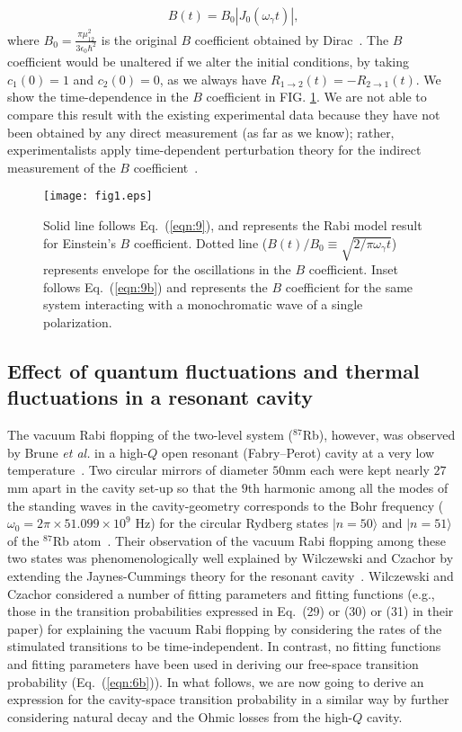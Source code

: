 \documentclass[aps,pra,twocolumn,showpacs,preprintnumbers,amsmath,amssymb,footinbib]{revtex4}
\begin{document}
\begin{eqnarray}\label{eqn:9}
B(t)=B_0|J_0(\omega_\gamma t)|,
\end{eqnarray}
where $B_0=\frac{\pi\mu_{12}^2}{3\epsilon_0\hbar^2}$ is the original $B$ coefficient obtained by Dirac~\cite{Dirac,Griffiths}. The $B$ coefficient would be unaltered if we alter the initial conditions, by taking $c_1(0)=1$ and $c_2(0)=0$, as we always have $R_{1\rightarrow2}(t)=-R_{2\rightarrow1}(t)$. We show the time-dependence in the $B$ coefficient in FIG. \ref{fig1}. We are not able to compare this result with the existing experimental data because they have not been obtained by any direct measurement (as far as we know); rather, experimentalists apply time-dependent perturbation theory for the indirect measurement of the $B$ coefficient~\cite{Lawrence}.  

\begin{figure}
\texttt{[image: fig1.eps]}
\caption{Solid line follows Eq.~(\ref{eqn:9}), and represents the Rabi model result for Einstein's $B$ coefficient. Dotted line ($B(t)/B_0\equiv\sqrt{2/\pi\omega_\gamma t}$) represents envelope for the oscillations in the $B$ coefficient. Inset follows Eq.~(\ref{eqn:9b}) and represents the $B$ coefficient for the same system interacting with a monochromatic wave of a single polarization. 
\label{fig1}}
\end{figure}

\subsection{Effect of quantum fluctuations and thermal fluctuations  in a resonant cavity}
The vacuum Rabi flopping of the two-level system ($^{87}$Rb), however, was observed by Brune \textit{et al.} in a high-$Q$ open resonant (Fabry--Perot) cavity at a very low temperature~\cite{Brune}. Two circular mirrors of diameter $50$mm each were kept nearly $27$mm apart in the cavity set-up so that the $9$th harmonic among all the modes of the standing waves in the cavity-geometry corresponds to the Bohr frequency ($\omega_0=2\pi\times51.099\times10^9$ Hz) for the circular Rydberg states $|n=50\rangle$ and $|n=51\rangle$ of the $^{87}$Rb atom~\cite{Brune}. Their observation of the vacuum Rabi flopping among these two states was phenomenologically well explained by Wilczewski and Czachor by extending the Jaynes-Cummings theory for the resonant cavity~\cite{Wilczewski}. Wilczewski and Czachor considered a number of fitting parameters and fitting functions (e.g., those in the transition probabilities expressed in Eq.~(29) or (30) or (31) in their paper) for explaining the vacuum Rabi flopping by considering the rates of the stimulated transitions to be time-independent. In contrast, no fitting functions and fitting parameters have been used in deriving our free-space transition probability (Eq.~(\ref{eqn:6b})). In what follows, we are now going to derive an expression for the cavity-space transition probability in a similar way by further considering natural decay and the Ohmic losses from the high-$Q$ cavity. 
\end{document}
